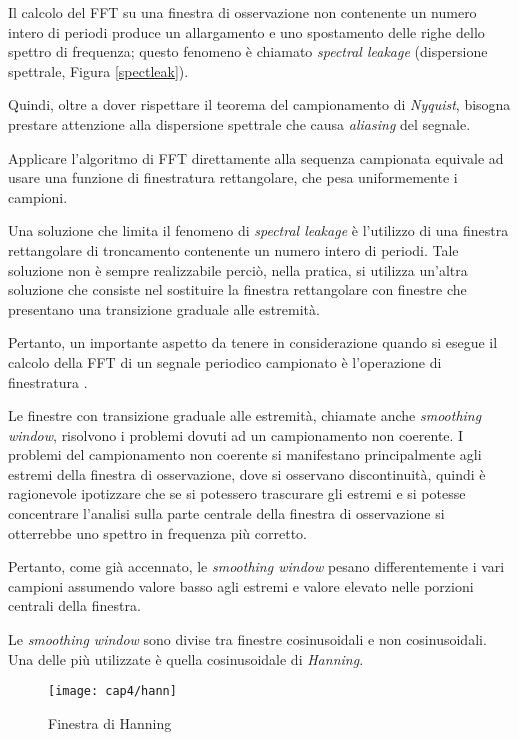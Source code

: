Il calcolo del FFT su una finestra di osservazione non contenente un numero intero di periodi produce un allargamento e uno spostamento delle righe dello spettro di frequenza; questo fenomeno è chiamato \textit{spectral leakage} (dispersione spettrale, Figura \ref{spectleak}). 

Quindi, oltre a dover rispettare il teorema del campionamento di \textit{Nyquist}, bisogna prestare attenzione alla dispersione spettrale che causa \textit{aliasing} del segnale.

Applicare l'algoritmo di FFT direttamente alla sequenza campionata equivale ad usare una funzione di finestratura rettangolare, che pesa uniformemente i campioni.

Una soluzione che limita il fenomeno di \textit{spectral leakage} è l'utilizzo di una finestra rettangolare di troncamento contenente un numero intero di periodi. Tale soluzione non è sempre realizzabile perciò, nella pratica, si utilizza un'altra soluzione che consiste nel sostituire la finestra rettangolare con finestre che presentano una transizione graduale alle estremità. 

Pertanto, un importante aspetto da tenere in considerazione quando si esegue il calcolo della FFT di un segnale periodico campionato è l'operazione di finestratura \cite{31004}. 

Le finestre con transizione graduale alle estremità, chiamate anche \textit{smoothing window}, risolvono i problemi dovuti ad un campionamento non coerente. I problemi del campionamento non coerente si manifestano principalmente agli estremi della finestra di osservazione, dove si osservano discontinuità, quindi è ragionevole ipotizzare che se si potessero trascurare gli estremi e si potesse concentrare l'analisi sulla parte centrale della finestra di osservazione si otterrebbe uno spettro in frequenza più corretto. 

Pertanto, come già accennato, le \textit{smoothing window} pesano differentemente i vari campioni assumendo valore basso agli estremi e valore elevato nelle porzioni centrali della finestra.

Le \textit{smoothing window} sono divise tra finestre cosinusoidali e non cosinusoidali. Una delle più utilizzate è quella cosinusoidale di \textit{Hanning}.
\begin{figure}  
  \begin{center}
    \texttt{[image: cap4/hann]}
    \caption{Finestra di Hanning}
    \label{hann}
  \end{center}
\end{figure}

